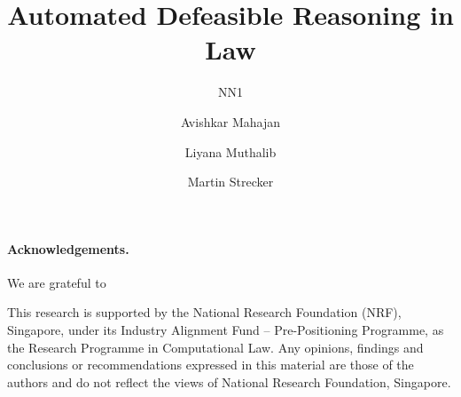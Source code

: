 \documentclass[runningheads]{llncs}
\begin{document}
\title{Automated Defeasible Reasoning in Law}

\author{NN1 \and
  Avishkar Mahajan \and
  Liyana Muthalib \and
  Martin Strecker}
\maketitle

\begin{abstract}

\end{abstract}













\paragraph{Acknowledgements.}
We are grateful to  

This research is supported by the National Research Foundation (NRF),
Singapore, under its Industry Alignment Fund – Pre-Positioning Programme, as
the Research Programme in Computational Law. Any opinions, findings and
conclusions or recommendations expressed in this material are those of the
authors and do not reflect the views of National Research Foundation,
Singapore.






\newpage
\appendix

\end{document}
